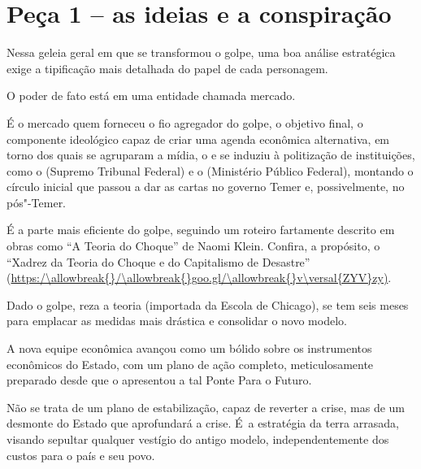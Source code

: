  

\section{Peça 1 -- as ideias e a conspiração}

Nessa geleia geral em que se transformou o golpe, uma boa análise
estratégica exige a tipificação mais detalhada do papel de cada
personagem.

O poder de fato está em uma entidade chamada mercado.

É o mercado quem forneceu o fio agregador do golpe, o objetivo final, o
componente ideológico capaz de criar uma agenda econômica alternativa,
em torno dos quais se agruparam a mídia, o  e se induziu à
politização de instituições, como o  (Supremo Tribunal Federal) e o
 (Ministério Público Federal), montando o círculo inicial que passou
a dar as cartas no governo Temer e, possivelmente, no pós"-Temer.

É a parte mais eficiente do golpe, seguindo um roteiro fartamente
descrito em obras como ``A Teoria do Choque'' de Naomi Klein. Confira, a
propósito, o ``Xadrez da Teoria do Choque e do Capitalismo de Desastre''
(\url{https:/\allowbreak{}/\allowbreak{}goo.gl/\allowbreak{}v\versal{ZYV}zy)}.

Dado o golpe, reza a teoria (importada da Escola de Chicago), se tem
seis meses para emplacar as medidas mais drástica e consolidar o novo
modelo.

A nova equipe econômica avançou como um bólido sobre os instrumentos
econômicos do Estado, com um plano de ação completo, meticulosamente
preparado desde que o  apresentou a tal Ponte Para o Futuro.

Não se trata de um plano de estabilização, capaz de reverter a crise,
mas de um desmonte do Estado que aprofundará a crise. É~a estratégia da
terra arrasada, visando sepultar qualquer vestígio do antigo modelo,
independentemente dos custos para o país e seu povo.

